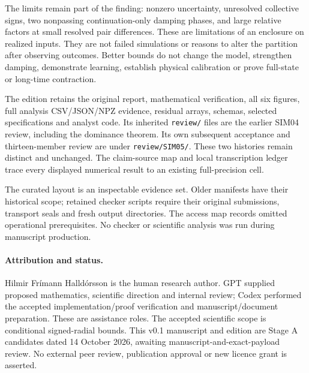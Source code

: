 \documentclass[11pt,a4paper]{article}
\begin{document}
The limits remain part of the finding: nonzero uncertainty, unresolved collective signs, two nonpassing continuation-only damping phases, and large relative factors at small resolved pair differences. These are limitations of an enclosure on realized inputs. They are not failed simulations or reasons to alter the partition after observing outcomes. Better bounds do not change the model, strengthen damping, demonstrate learning, establish physical calibration or prove full-state or long-time contraction.

The edition retains the original report, mathematical verification, all six figures, full analysis CSV/JSON/NPZ evidence, residual arrays, schemas, selected specifications and analyst code. Its inherited \texttt{review/} files are the earlier SIM04 review, including the dominance theorem. Its own subsequent acceptance and thirteen-member review are under \texttt{review/SIM05/}. These two histories remain distinct and unchanged. The claim-source map and local transcription ledger trace every displayed numerical result to an existing full-precision cell.

The curated layout is an inspectable evidence set. Older manifests have their historical scope; retained checker scripts require their original submissions, transport seals and fresh output directories. The access map records omitted operational prerequisites. No checker or scientific analysis was run during manuscript production.

\paragraph{Attribution and status.} Hilmir Frímann Halldórsson is the human research author. GPT supplied proposed mathematics, scientific direction and internal review; Codex performed the accepted implementation/proof verification and manuscript/document preparation. These are assistance roles. The accepted scientific scope is conditional signed-radial bounds. This v0.1 manuscript and edition are Stage A candidates dated 14 October 2026, awaiting manuscript-and-exact-payload review. No external peer review, publication approval or new licence grant is asserted.
\end{document}
